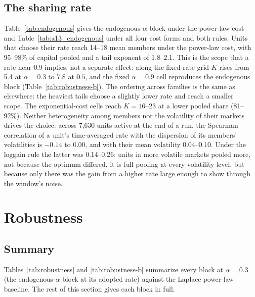 


\subsection{The sharing rate}\label{app:alpha}

Table~\ref{tab:endogenous} gives the endogenous-$\alpha$ block under the power-law cost and Table~\ref{tab:a13_endogenous} under all four cost forms and both rules. Units that choose their rate reach 14--18 mean members under the power-law cost, with 95--98\% of capital pooled and a tail exponent of 1.8--2.1. This is the scope that a rate near 0.9 implies, not a separate effect: along the fixed-rate grid $K$ rises from 5.4 at $\alpha = 0.3$ to 7.8 at $0.5$, and the fixed $\alpha = 0.9$ cell reproduces the endogenous block (Table~\ref{tab:robustness-b}). The ordering across families is the same as elsewhere: the heaviest tails choose a slightly lower rate and reach a smaller scope. The exponential-cost cells reach $K = 16$--23 at a lower pooled share (81--92\%). Neither heterogeneity among members nor the volatility of their markets drives the choice: across 7,630 units active at the end of a run, the Spearman correlation of a unit's time-averaged rate with the dispersion of its members' volatilities is $-0.14$ to $0.00$, and with their mean volatility 0.04--0.10. Under the loggain rule the latter was 0.14--0.26: units in more volatile markets pooled more, not because the optimum differed, it is full pooling at every volatility level, but because only there was the gain from a higher rate large enough to show through the window's noise.




\section{Robustness}\label{app:robustness}

\subsection{Summary}

Tables~\ref{tab:robustness} and \ref{tab:robustness-b} summarize every block at $\alpha = 0.3$ (the endogenous-$\alpha$ block at its adopted rate) against the Laplace power-law baseline. The rest of this section gives each block in full.

